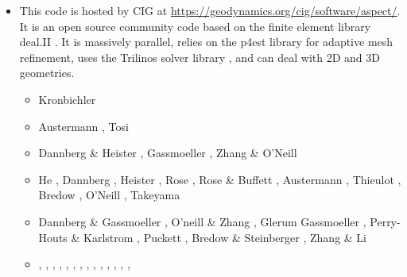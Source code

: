 \begin{itemize}
\item \aspect {}

This code is hosted by CIG at \url{https://geodynamics.org/cig/software/aspect/}. 
It is an open source community code based on the finite element library deal.II \cite{bahk07,arbc19,arbd20}. 
It is massively parallel, relies on the p4est library for adaptive mesh refinement,
uses the Trilinos solver library \cite{hewi12}, and can deal with 2D and 3D geometries. 

\begin{scriptsize}
\begin{itemize}
\item[\twothousandtwelve] Kronbichler \etal \cite{krhb12}
\item[\twothousandfifteen] Austermann \etal \cite{aupm15}, Tosi \etal \cite{tosn15}
\item[\twothousandsixteen] Dannberg \& Heister \cite{dahe16}, Gassmoeller \etal \cite{gadb16}, 
                           Zhang \& O'Neill \cite{zhon16}
\item[\twothousandseventeen] He \etal \cite{hepb17}, Dannberg \etal \cite{daef17}, 
                             Heister \etal \cite{hedg17}, Rose \etal \cite{robh17}, 
                             Rose \& Buffett \cite{robu17}, Austermann \etal \cite{aumh17},
                             Thieulot \cite{thie17}, Bredow \etal \cite{brsg17}, 
                             O'Neill \etal \cite{onmz17}, Takeyama \etal \cite{tasm17}
\item[\twothousandeighteen] Dannberg \& Gassmoeller \cite{daga18}, O'neill \& Zhang \cite{onzh18}, 
                            Glerum \etal \cite{gltf18}
                            Gassmoeller \etal \cite{galh18}, 
                            Perry-Houts \& Karlstrom \cite{peka18}, Puckett \etal \cite{puth18},
                            Bredow \& Steinberger \cite{brst18b}, Zhang \& Li \cite{zhli18}
\item[\twothousandnineteen]  \textcite{baba19},  \textcite{stbl19}, 
                             \textcite{cocf19},  \textcite{liki19}, 
                             \textcite{galb19},  \textcite{dagg19},
                             \textcite{njas19},  \textcite{sepg19}, 
                             \textcite{ropu19},  \textcite{frtv19},  \textcite{frbt19},
                             \textcite{lixs19},  \textcite{hepm19},  \textcite{heps19}, 

\end{itemize}
\end{scriptsize}
\end{itemize}
